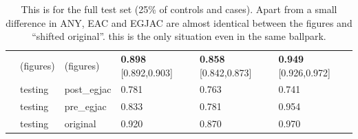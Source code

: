 \documentclass[12pt]{article}
\begin{document}
\begin{table}[ht]
\begin{tabular}{rlllll}
 & (figures) & (figures)  & \textbf{0.898} [0.892,0.903] & \textbf{0.858} [0.842,0.873] & \textbf{0.949} [0.926,0.972] \\ \addlinespace
 
 & testing& post\_egjac & 0.781 & 0.763 & 0.741 \\
 & testing & pre\_egjac & 0.833 & 0.781 & 0.954 \\
 & testing& original & 0.920 & 0.870 & 0.970 \\
\bottomrule
\end{tabular}
\caption{This is for the full test set (25\% of controls and cases). Apart from a small difference in ANY, EAC and EGJAC are almost identical between the figures and ``shifted original''.
this is the only situation even in the same ballpark.}
\end{table}
\end{document}
